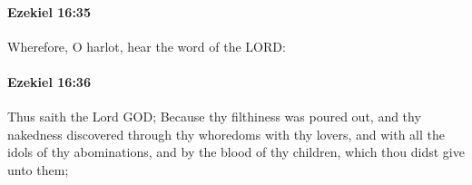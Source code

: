 		\paragraph{Ezekiel 16:35} %
			\label{EZEKIEL-16-35}

			Wherefore, O harlot, hear the word of the LORD:


		\paragraph{Ezekiel 16:36} %
			\label{EZEKIEL-16-36}

			Thus saith the Lord GOD; Because thy filthiness was poured out, and thy nakedness discovered through thy whoredoms with thy lovers, and with all the idols of thy abominations, and by the blood of thy children, which thou didst give unto them;


